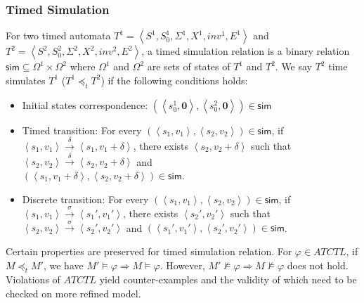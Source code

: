 \subsubsection{Timed Simulation}
For two timed automata $T^1=\left\langle S^1,S_0^1,\Sigma^1,X^1,inv^1,E^1\right\rangle$ and $T^2=\left\langle S^2,S_0^2,\Sigma^2,X^2,inv^2,E^2\right\rangle$, a timed simulation relation is a binary relation $\textsf{sim}\subseteq \Omega^1\times \Omega^2$ where $\Omega^1$ and $\Omega^2$ are sets of states of $T^1$ and $T^2$. We say $T^2$ \textsf{time simulates} $T^1$ ($T^1 \preceq_t T^2$) if the following conditions holds:
\begin{itemize}
	\item Initial states correspondence: $(\left\langle s_0^1,\textbf{0}\right\rangle,\left\langle s_0^2,\textbf{0}\right\rangle)\in \textsf{sim}$
	\item Timed transition: For every $(\left\langle s_1,v_1\right\rangle,\left\langle s_2,v_2\right\rangle)\in\textsf{sim}$, if $\left\langle s_1,v_1\right\rangle\xrightarrow{\delta}\left\langle s_1,v_1+\delta\right\rangle$, there exists $\left\langle s_2,v_2+\delta\right\rangle$ such that $\left\langle s_2,v_2\right\rangle\xrightarrow{\delta}\left\langle s_2,v_2+\delta\right\rangle$ and \\$(\left\langle s_1,v_1+\delta\right\rangle,\left\langle s_2,v_2+\delta\right\rangle)\in\textsf{sim}$.
	\item Discrete transition: For every $(\left\langle s_1,v_1\right\rangle,\left\langle s_2,v_2\right\rangle)\in\textsf{sim}$, if $\left\langle s_1,v_1\right\rangle\xrightarrow{\sigma}\left\langle s_1',v_1'\right\rangle$, there exists $\left\langle s_2',v_2'\right\rangle$ such that $\left\langle s_2,v_2\right\rangle\xrightarrow{\sigma}\left\langle s_2',v_2'\right\rangle$ and $(\left\langle s_1',v_1'\right\rangle,\left\langle s_2',v_2'\right\rangle)\in\textsf{sim}$.
\end{itemize}

Certain properties are preserved for timed simulation relation. For $\varphi\in ATCTL$, if $M\preceq_t M'$, we have $M'\models \varphi\Rightarrow M\models\varphi$.\cite{simulation} However, $M'\not\models \varphi\Rightarrow M\not\models\varphi$ does not hold. Violations of $ATCTL$ yield \textsf{counter-examples} and the validity of which need to be checked on more refined model.


